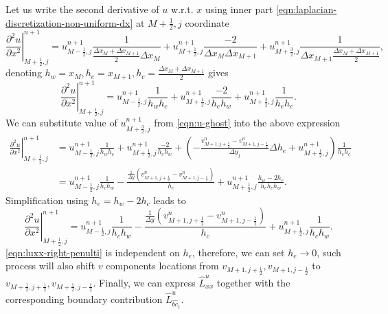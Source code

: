 \documentclass{article}
\numberwithin{equation}{section}
\begin{document}
Let us write the second derivative of $u$ w.r.t. $x$ using inner part \cref{eqn:laplacian-discretization-non-uniform-dx} at $M+\frac{1}{2},j$ coordinate 
\begin{equation}
	\left.\frac{\partial^2 u}{\partial x^2}\right|^{n+1}_{M+\frac{1}{2},j}=
		u^{n+1}_{M-\frac{1}{2},j}\frac{1}{\frac{\Delta x_M+\Delta x_{M+1}}{2} \Delta x_M}
		+u^{n+1}_{M+\frac{1}{2},j}\frac{-2}{\Delta x_M \Delta x_{M+1}}
		+u^{n+1}_{M+\frac{3}{2},j}\frac{1}{\Delta x_{M+1}\frac{\Delta x_M+\Delta x_{M+1}}{2}},
\end{equation}
denoting $h_w=x_M,h_e=x_{M+1},h_c=\frac{\Delta x_M+\Delta x_{M+1}}{2}$ gives
\begin{equation}
	\left.\frac{\partial^2 u}{\partial x^2}\right|^{n+1}_{M+\frac{1}{2},j}=
		u^{n+1}_{M-\frac{1}{2},j}\frac{1}{h_w h_c}
		+u^{n+1}_{M+\frac{1}{2},j}\frac{-2}{h_e h_w}
		+u^{n+1}_{M+\frac{3}{2},j}\frac{1}{h_e h_c}.
\end{equation}
We can substitute value of $u^{n+1}_{M+\frac{3}{2},j}$ from \cref{eqn:u-ghost} into the above expression
\begin{align}
	\left.\frac{\partial^2 u}{\partial x^2}\right|^{n+1}_{M+\frac{1}{2},j}&=
		u^{n+1}_{M-\frac{1}{2},j}\frac{1}{h_w h_c}
		+u^{n+1}_{M+\frac{1}{2},j}\frac{-2}{h_e h_w}
		+\left( -\frac{v^n_{M+1,j+\frac{1}{2}}-v^n_{M+1,j-\frac{1}{2}}}{\Delta y_j}\Delta h_e+u^{n+1}_{M+\frac{1}{2},j}\right)\frac{1}{h_e h_c}\\
		&=u^{n+1}_{M-\frac{1}{2},j}\frac{1}{h_c h_w}
		-\frac{\frac{1}{\Delta y}\left( v^n_{M+1,j+\frac{1}{2}}-v^n_{M+1,j-\frac{1}{2}} \right)}{h_c}
		+u^{n+1}_{M+\frac{1}{2},j}\frac{h_w-2h_c}{h_c h_e h_w}.
\end{align}
Simplification using $h_e=h_w-2h_c$ leads to 
\begin{equation}\label{eqn:luxx-right-penulti}
	\left.\frac{\partial^2 u}{\partial x^2}\right|^{n+1}_{M+\frac{1}{2},j}=
	u^{n+1}_{M-\frac{1}{2},j}\frac{1}{h_c h_w}
	-\frac{\frac{1}{\Delta y}\left( v^n_{M+1,j+\frac{1}{2}}-v^n_{M+1,j-\frac{1}{2}} \right)}{h_c}
	+u^{n+1}_{M+\frac{1}{2},j}\frac{1}{h_c h_w}.
\end{equation}
\cref{eqn:luxx-right-penulti} is independent on $h_e$, therefore, we can set $h_e\to 0$, such process will also shift $v$ components locations from $v_{M+1,j+\frac{1}{2}},v_{M+1,j-\frac{1}{2}}$ to $v_{M+\frac{1}{2},j+\frac{1}{2}},v_{M+\frac{1}{2},j-\frac{1}{2}}$. Finally, we can express $\hat{L}^u_{xx}$ together with the corresponding boundary contribution $\hat{L}^u_{\hat{bc}_1}$.
\end{document}
